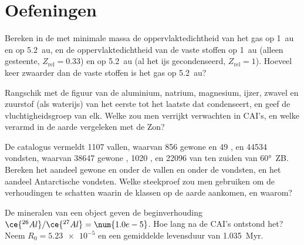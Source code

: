 \section{Oefeningen}

\begin{exercise}[$\star$]\label{exo:b2:planet-formation-meteorites:1}
Bereken in de  met minimale massa de oppervlaktedichtheid van het gas op
\qty{1}{au} en op \qty{5.2}{au}, en de oppervlaktedichtheid van de vaste stoffen op
\qty{1}{au} (alleen gesteente, $Z_{\mathrm{rel}} = 0.33$) en op \qty{5.2}{au} (al het ijs
gecondenseerd, $Z_{\mathrm{rel}} = 1$). Hoeveel keer zwaarder dan de vaste stoffen is het
gas op \qty{5.2}{au}?
\end{exercise}

\begin{exercise}[$\star$]\label{exo:b2:planet-formation-meteorites:2}
Rangschik met de figuur van de  aluminium, natrium,
magnesium, ijzer, zwavel en zuurstof (als waterijs) van het eerste tot het laatste dat
condenseert, en geef de vluchtigheidsgroep van elk. Welke zou men verrijkt verwachten
in CAI's, en welke verarmd in de aarde vergeleken met de Zon?
\end{exercise}

\begin{exercise}[$\star$]\label{exo:b2:planet-formation-meteorites:3}
De catalogus vermeldt \num{1107} vallen, waarvan 856 gewone  en
49 , en \num{44534} vondsten, waarvan \num{38647} gewone ,
\num{1020} , en \num{22096} van ten zuiden van \ang{60}~ZB. Bereken het
aandeel gewone  en  onder de vallen en onder de vondsten,
en het aandeel Antarctische vondsten. Welke steekproef zou men gebruiken om de
verhoudingen te schatten waarin de klassen op de aarde aankomen, en waarom?
\end{exercise}

\begin{exercise}[$\star$]\label{exo:b2:planet-formation-meteorites:4}
De mineralen van een object geven de beginverhouding
$\ce{^{26}Al}/\ce{^{27}Al} = \num{1.0e-5}$. Hoe lang na de CAI's ontstond het?
Neem $R_0 = \num{5.23e-5}$ en een gemiddelde levensduur van \qty{1.035}{Myr}.
\end{exercise}


